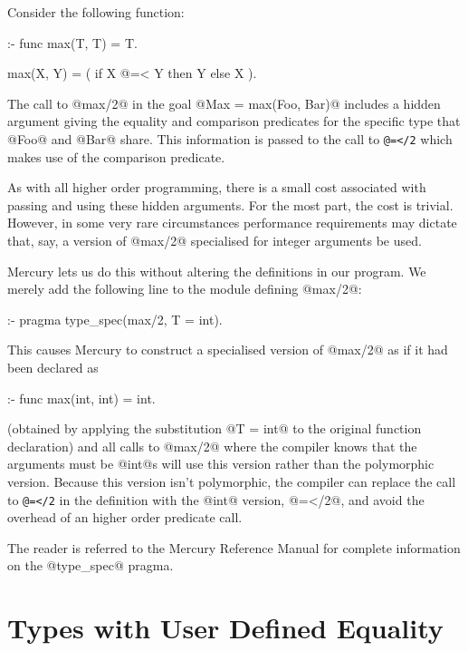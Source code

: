 Consider the following function:
\begin{myverbatim}
:- func max(T, T) = T.

max(X, Y) = ( if X @=< Y then Y else X ).
\end{myverbatim}
The call to @max/2@ in the goal @Max = max(Foo, Bar)@ includes a hidden
argument giving the equality and comparison predicates for the specific type
that @Foo@ and @Bar@ share.  This information is passed to the call to
\verb!@=</2! which makes use of the comparison predicate.

As with all higher order programming, there is a small cost associated with
passing and using these hidden arguments.  For the most part, the cost is
trivial.  However, in some very rare circumstances performance requirements
may dictate that, say, a version of @max/2@ specialised for integer
arguments be used.

Mercury lets us do this without altering the definitions in our program.  We
merely add the following line to the module defining @max/2@:
\begin{myverbatim}
:- pragma type_spec(max/2, T = int).
\end{myverbatim}
This causes Mercury to construct a specialised version of @max/2@ as if it
had been declared as
\begin{myverbatim}
:- func max(int, int) = int.
\end{myverbatim}
(obtained by applying the substitution @T = int@ to the original function
declaration)
and all calls to @max/2@ where the compiler knows that the arguments must be
@int@s will use this version rather than the polymorphic version.
Because this version isn't polymorphic, the compiler can replace the call to
\verb!@=</2! in the definition with the
@int@ version, @=</2@, and avoid the overhead of an higher order predicate
call.

The reader is referred to the Mercury Reference Manual \XXX{} for complete
information on the @type_spec@ pragma.

\section{Types with User Defined Equality}




